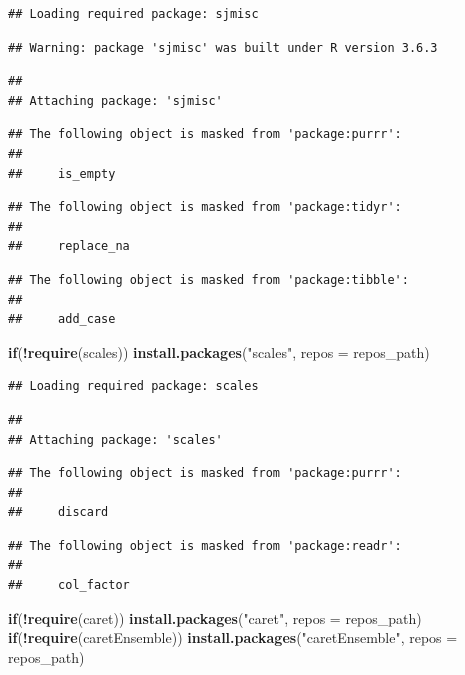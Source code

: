\documentclass[]{article}
\newenvironment{Shaded}{\begin{snugshade}}{\end{snugshade}}
\newcommand{\ControlFlowTok}[1]{\textcolor[rgb]{0.13,0.29,0.53}{\textbf{#1}}}
\newcommand{\DataTypeTok}[1]{\textcolor[rgb]{0.13,0.29,0.53}{#1}}
\newcommand{\KeywordTok}[1]{\textcolor[rgb]{0.13,0.29,0.53}{\textbf{#1}}}
\newcommand{\NormalTok}[1]{#1}
\newcommand{\OperatorTok}[1]{\textcolor[rgb]{0.81,0.36,0.00}{\textbf{#1}}}
\newcommand{\StringTok}[1]{\textcolor[rgb]{0.31,0.60,0.02}{#1}}
\begin{document}
\begin{verbatim}
## Loading required package: sjmisc
\end{verbatim}

\begin{verbatim}
## Warning: package 'sjmisc' was built under R version 3.6.3
\end{verbatim}

\begin{verbatim}
## 
## Attaching package: 'sjmisc'
\end{verbatim}

\begin{verbatim}
## The following object is masked from 'package:purrr':
## 
##     is_empty
\end{verbatim}

\begin{verbatim}
## The following object is masked from 'package:tidyr':
## 
##     replace_na
\end{verbatim}

\begin{verbatim}
## The following object is masked from 'package:tibble':
## 
##     add_case
\end{verbatim}

\begin{Shaded}
\begin{Highlighting}[]
\ControlFlowTok{if}\NormalTok{(}\OperatorTok{!}\KeywordTok{require}\NormalTok{(scales)) }\KeywordTok{install.packages}\NormalTok{(}\StringTok{"scales"}\NormalTok{, }\DataTypeTok{repos =}\NormalTok{ repos_path)}
\end{Highlighting}
\end{Shaded}

\begin{verbatim}
## Loading required package: scales
\end{verbatim}

\begin{verbatim}
## 
## Attaching package: 'scales'
\end{verbatim}

\begin{verbatim}
## The following object is masked from 'package:purrr':
## 
##     discard
\end{verbatim}

\begin{verbatim}
## The following object is masked from 'package:readr':
## 
##     col_factor
\end{verbatim}

\begin{Shaded}
\begin{Highlighting}[]
\ControlFlowTok{if}\NormalTok{(}\OperatorTok{!}\KeywordTok{require}\NormalTok{(caret)) }\KeywordTok{install.packages}\NormalTok{(}\StringTok{"caret"}\NormalTok{, }\DataTypeTok{repos =}\NormalTok{ repos_path)}
\ControlFlowTok{if}\NormalTok{(}\OperatorTok{!}\KeywordTok{require}\NormalTok{(caretEnsemble)) }\KeywordTok{install.packages}\NormalTok{(}\StringTok{"caretEnsemble"}\NormalTok{, }\DataTypeTok{repos =}\NormalTok{ repos_path)}
\end{Highlighting}
\end{Shaded}
\end{document}

